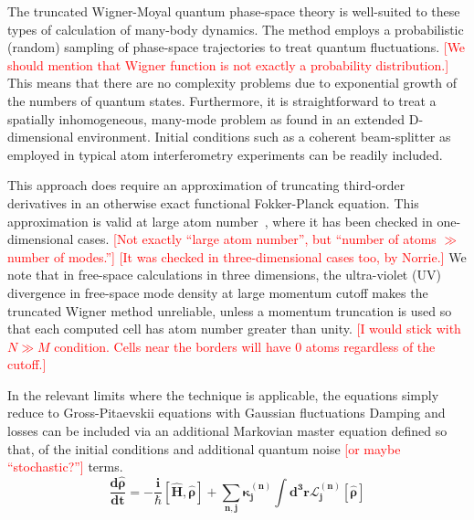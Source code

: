 \documentclass[aps,prl,twocolumn,showpacs,amsmath,amssymb,superscriptaddress]{revtex4-1}
\newcommand{\remark}[1]{\textcolor{red}{{[}#1{]}}}
\begin{document}
The truncated Wigner-Moyal quantum phase-space theory is well-suited
to these types of calculation of many-body dynamics.
The method employs a probabilistic (random) sampling of phase-space trajectories
to treat quantum fluctuations.
	\remark{We should mention that Wigner function is not exactly a probability distribution.}
This means that there are no complexity problems due to exponential growth
of the numbers of quantum states.
Furthermore, it is straightforward to treat a spatially inhomogeneous,
many-mode problem as found in an extended D-dimensional environment.
Initial conditions such as a coherent beam-splitter
as employed in typical atom interferometry experiments can be readily included.

This approach does require an approximation of truncating third-order derivatives
in an otherwise exact functional Fokker-Planck equation.
This approximation is valid at large atom number~\cite{Sinatra2002,Norrie2006},
where it has been checked in one-dimensional cases.
	\remark{Not exactly ``large atom number'', but ``number of atoms $\gg$ number of modes.''}
	\remark{It was checked in three-dimensional cases too, by Norrie.}
We note that in free-space calculations in three dimensions,
the ultra-violet (UV) divergence in free-space mode density at large momentum cutoff
makes the truncated Wigner method unreliable,
unless a momentum truncation is used so that each computed cell has atom number greater than unity.
	\remark{I would stick with $N \gg M$ condition.
	Cells near the borders will have 0 atoms regardless of the cutoff.}

In the relevant limits where the technique is applicable,
the equations simply reduce to Gross-Pitaevskii equations with Gaussian fluctuations
Damping and losses can be included via an additional Markovian master equation defined so that,
of the initial conditions and additional quantum noise \remark{or maybe ``stochastic?''} terms.
\begin{equation}
\bm{
	\frac{d\hat{\rho}}{dt} = -\frac{i}{\hbar} \left[ \hat{H}, \hat{\rho} \right] +
	\sum_{n,\mathbf{j}} \kappa_{\mathbf{j}}^{(n)}
	\int d^{3}\mathbf{r}\mathcal{L}_{\mathbf{j}}^{(n)} \left[ \hat{\rho} \right]
}
\end{equation}
\end{document}
